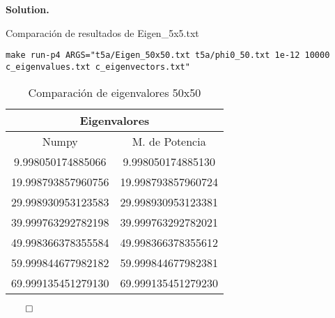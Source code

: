 \documentclass{article}
\theoremstyle{problemstyle}
\newenvironment{solution}{%
  \begin{mdframed}[linewidth=0.8pt,linecolor=Gray,backgroundcolor=Gray!5,roundcorner=5pt]%
  \noindent\textbf{Solution.}%
}{%
\hfill $ \qed $ 
  \end{mdframed}%
}
\begin{document}
\begin{solution}
\begin{table}[H]
\begin{center}
    \end{center}
    \caption{Comparaci\'on de resultados de Eigen\_5x5.txt}\label{tab:evecs3x5_identical}
\end{table}



\begin{center}
  \texttt{make run-p4 ARGS="t5a/Eigen\_50x50.txt t5a/phi0\_50.txt 1e-12 10000 c\_eigenvalues.txt c\_eigenvectors.txt"}
\end{center}

\begin{table}[H]
    \begin{center}
        \begin{tabular}{|c|c|}
            \multicolumn{2}{c}{Eigenvalores}   \\
            \hline
            Numpy             & M. de Potencia \\
            \hline

            9.998050174885066 & 9.998050174885130 \\
            \hline
            19.998793857960756 & 19.998793857960724 \\
            \hline
            29.998930953123583 & 29.998930953123381 \\
            \hline
            39.999763292782198 & 39.999763292782021 \\
            \hline
            49.998366378355584 & 49.998366378355612 \\
            \hline
            59.999844677982182 & 59.999844677982381 \\
            \hline
            69.999135451279130 & 69.999135451279230 \\
            \hline
        \end{tabular}
    \end{center}
    \caption{Comparaci\'on de eigenvalores 50x50}\label{tab:evals_comparison_large3}
\end{table}





\end{solution}
\end{document}
